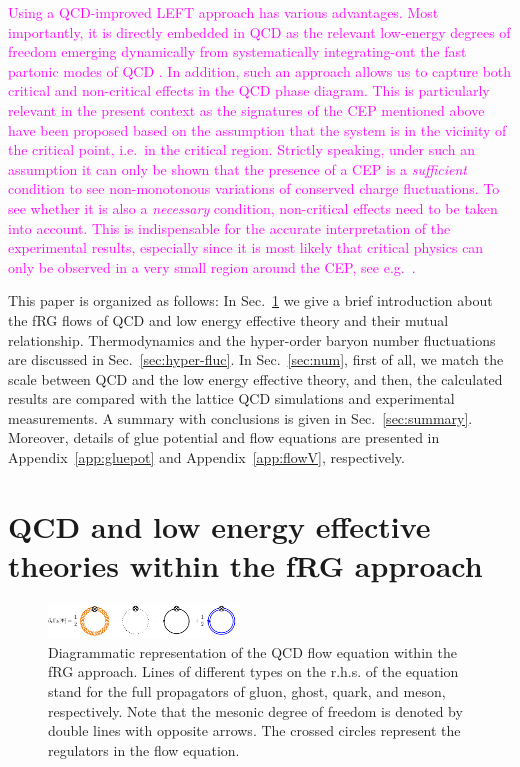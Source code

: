 \documentclass[%
reprint,
superscriptaddress,
showpacs,preprintnumbers,
 amsmath,amssymb,
 aps,
prd,
]{revtex4-1}
\def\sec#1{Sec.~\ref{#1}}
\def\app#1{Appendix~\ref{#1}}
\newcommand{\colfab}[1]{\textcolor{magenta}{#1}}
\begin{document}
\colfab{
Using a QCD-improved LEFT approach has various advantages. Most importantly, it is directly embedded in QCD as the relevant low-energy degrees of freedom emerging dynamically from systematically integrating-out the fast partonic modes of QCD \cite{Mitter:2014wpa, Braun:2014ata, Rennecke:2015eba, Cyrol:2017ewj, Fu:2019hdw}. In addition, such an approach allows us to capture both critical and non-critical effects in the QCD phase diagram. This is particularly relevant in the present context as the signatures of the CEP mentioned above have been proposed based on the assumption that the system is in the vicinity of the critical point, i.e.\ in the critical region. Strictly speaking, under such an assumption it can only be shown that the presence of a CEP is a \emph{sufficient} condition to see non-monotonous variations of conserved charge fluctuations. To see whether it is also a \emph{necessary} condition, non-critical effects need to be taken into account. This is indispensable for the accurate interpretation of the experimental results, especially since it is most likely that critical physics can only be observed in a very small region around the CEP, see e.g.\ \cite{Schaefer:2006ds}.
}

This paper is organized as follows: In \sec{sec:FRG} we give a brief introduction about the fRG flows of QCD and low energy effective theory and their mutual relationship. Thermodynamics and the hyper-order baryon number fluctuations are discussed in \sec{sec:hyper-fluc}. In \sec{sec:num}, first of all, we match the scale between QCD and the low energy effective theory, and then, the calculated results are compared with the lattice QCD simulations and experimental measurements. A summary with conclusions is given in \sec{sec:summary}. Moreover, details of glue potential and flow equations are presented in \app{app:gluepot} and \app{app:flowV}, respectively.





\section{QCD and low energy effective theories within the fRG approach}
\label{sec:FRG}

%
\begin{figure}[t]
\includegraphics[width=0.45\textwidth]{QCD_equation}
\caption{Diagrammatic representation of the QCD flow equation within the fRG approach. Lines of different types on the r.h.s. of the equation stand for the full propagators of gluon, ghost, quark, and meson, respectively. Note that the mesonic degree of freedom is denoted by double lines with opposite arrows. The crossed circles represent the regulators in the flow equation.}\label{fig:QCD_equation}
\end{figure}
%
\end{document}
